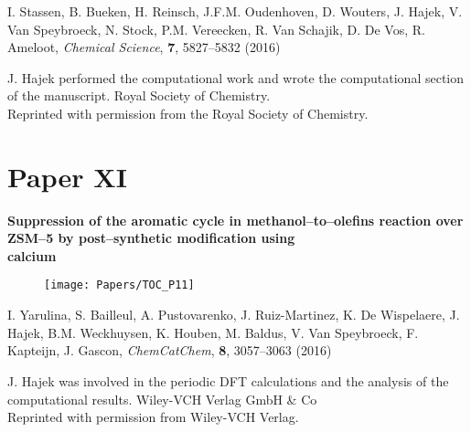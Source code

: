 \noindent
I. Stassen, B. Bueken, H. Reinsch, J.F.M. Oudenhoven, D. Wouters, J. Hajek, V.
Van Speybroeck, N. Stock, P.M. Vereecken, R. Van Schajik, D. De Vos, R. Ameloot,
\textit{Chemical Science}, \textbf{7}, 5827--5832 (2016)
\npar

\vfill
\noindent J. Hajek performed the computational work and wrote the computational
section of the manuscript.
\npar
\noindent {} Royal Society of Chemistry. \\
Reprinted with permission from the Royal Society of Chemistry.

\clearpage{\pagestyle{empty}\cleardoublepage}

 

\clearpage{\pagestyle{empty}\cleardoublepage}


\section*{Paper XI}

\vspace{0.1\textheight}
{
\large
\textbf{Suppression of the aromatic
cycle in methanol--to--olefins reaction over ZSM--5 by post--synthetic
modification using\\ calcium} }
\begin{figure}[h!]
	\centering
	\texttt{[image: Papers/TOC\_P11]}
\end{figure}
 
\noindent
I. Yarulina, S. Bailleul, A. Pustovarenko, J. Ruiz-Martinez, K. De Wispelaere,
J. Hajek, B.M. Weckhuysen, K. Houben, M. Baldus, V. Van Speybroeck, F. Kapteijn, J. Gascon, \textit{ChemCatChem}, \textbf{8}, 3057--3063 (2016)
\npar


\vfill

\noindent J. Hajek was involved in the periodic DFT calculations and the
analysis of the computational results.
\npar
\noindent {} Wiley-VCH Verlag GmbH \& Co \\
Reprinted with permission from Wiley-VCH Verlag.
\clearpage{\pagestyle{empty}\cleardoublepage}

 

\clearpage{\pagestyle{empty}\cleardoublepage}



%
%

\clearpage{\pagestyle{empty}\cleardoublepage}
